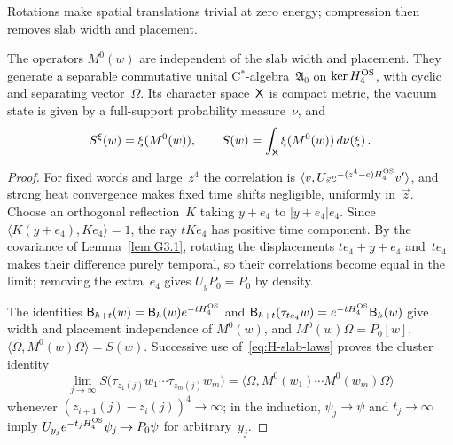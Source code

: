 Rotations make spatial translations trivial at zero energy; compression then removes slab width and placement.
\begin{lemma}\label{lem:H1.2}
The operators $M^0(w)$ are independent of the slab width and placement. They generate a separable commutative unital C$^*$-algebra~$\mathfrak A_0$ on $\ker H_4^{\rm OS}$, with cyclic and separating vector~$\Omega$. Its character space~$\mathsf{X}$ is compact metric, the vacuum state is given by a full-support probability measure~$\nu$, and
\begin{equation*}
S^\xi(w)=\xi(M^0(w)),\qquad S(w)=\int_{\mathsf{X}}\xi(M^0(w))\,d\nu(\xi)\,.
\end{equation*}
\end{lemma}
\begin{proof}
For fixed words and large~$z^4$ the correlation is $\langle v,U_{\vec z}e^{-(z^4-c)H_4^{\rm OS}}v'\rangle$, and strong heat convergence makes fixed time shifts negligible, uniformly in~$\vec z$. Choose an orthogonal reflection~$K$ taking $y+e_4$ to $|y+e_4|e_4$. Since $\langle K(y+e_4),Ke_4\rangle=1$, the ray $tKe_4$ has positive time component. By the covariance of Lemma~\ref{lem:G3.1}, rotating the displacements $te_4+y+e_4$ and~$te_4$ makes their difference purely temporal, so their correlations become equal in the limit; removing the extra~$e_4$ gives $U_yP_0=P_0$ by density.

The identities $\mathsf B_{h+t}(w)=\mathsf B_h(w)e^{-tH_4^{\rm OS}}$ and $\mathsf B_{h+t}(\tau_{te_4}w)=e^{-tH_4^{\rm OS}}\mathsf B_h(w)$ give width and placement independence of $M^0(w)$, and $M^0(w)\Omega=P_0[w]$, $\langle\Omega,M^0(w)\Omega\rangle=S(w)$. Successive use of~\eqref{eq:H-slab-laws} proves the cluster identity
\begin{equation}\label{eq:H-clusters}
\lim_{j\to\infty}S\bigl(\tau_{z_1(j)}w_1\cdots\tau_{z_m(j)}w_m\bigr)
=\langle\Omega,M^0(w_1)\cdots M^0(w_m)\Omega\rangle
\end{equation}
whenever $(z_{i+1}(j)-z_i(j))^4\to\infty$; in the induction, $\psi_j\to\psi$ and $t_j\to\infty$ imply $U_{y_j}e^{-t_jH_4^{\rm OS}}\psi_j\to P_0\psi$ for arbitrary~$y_j$.


\end{proof}
